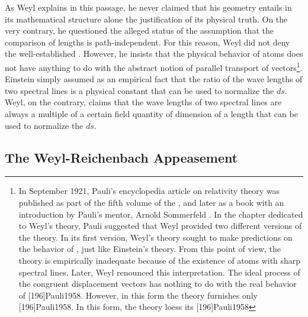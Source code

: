 \documentclass[draft]{article}
\newcommand{\WT}{Weyl's theory\xspace}
\begin{document}
As Weyl explains in this passage, he never claimed that his geometry entails in its mathematical structure alone the \apr justification of its physical truth. On the very contrary, he questioned the alleged \apr status of the assumption that the comparison of lengths is path-independent. For this reason, Weyl did not deny the well-established . However, he insists that the physical behavior of atoms does not have anything to do with the abstract notion of parallel transport of vectors\footnote{\label{pauli}In September 1921, Pauli's encyclopedia article on relativity theory was published as part of the fifth volume of the , and later as a book with an introduction by Pauli's mentor, Arnold Sommerfeld \citep{Pauli1921}. In the chapter dedicated to \WT, Pauli suggested that Weyl provided two different versions of the theory. In its first version, \WT sought to make predictions on the behavior of \rac, just like Einstein's theory. From this point of view, the theory is empirically inadequate because of the existence of atoms with sharp spectral lines. Later, Weyl renounced this interpretation. The ideal process of the congruent displacement vectors has nothing to do with the real behavior of \rac {}[196]{Pauli1958}. However, in this form the theory furnishes only  [196]{Pauli1958}. In this form, the theory loess its  [196]{Pauli1958}}. Einstein simply assumed as an empirical fact that the ratio of the wave lengths of two spectral lines is a  physical constant that can be used to normalize the $ds$. Weyl, on the contrary, claims that the wave lengths of two spectral lines are always a multiple of a certain field quantity of dimension of a length that can be used to normalize the $ds$. 


\subsection{The Weyl-Reichenbach Appeasement}

  
\end{document}
